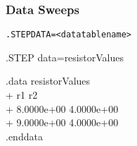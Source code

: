 \subsubsection{Data Sweeps}
 

\begin{Command}
\format
\begin{alltt}
.STEP DATA=<data table name> 
\end{alltt}

\examples
.STEP data=resistorValues

.data resistorValues \\
+ r1   r2 \\
+ 8.0000e+00  4.0000e+00 \\
+ 9.0000e+00  4.0000e+00 \\
.enddata

\end{Command}
